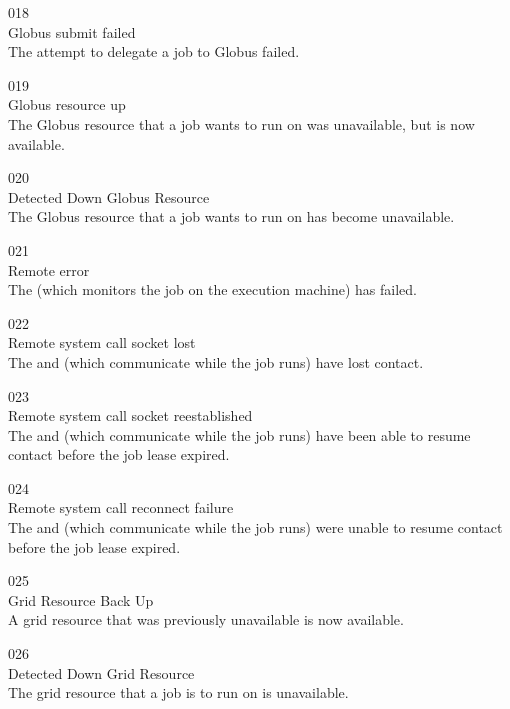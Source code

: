 \noindent{} 018 \\
 Globus submit failed \\
 The attempt to delegate a job to Globus
failed. 

\noindent{} 019 \\
 Globus resource up \\
 The Globus resource that a job wants to run
on was unavailable, but is now available.

\noindent{} 020 \\
 Detected Down Globus Resource \\
 The Globus resource that a job wants to run
on has become unavailable. 

\noindent{} 021 \\
 Remote error \\
 The  (which monitors the job
on the execution machine) has failed.

\noindent{} 022 \\
 Remote system call socket lost \\
 The  and 
(which communicate while the job runs) have lost contact.

\noindent{} 023 \\
 Remote system call socket reestablished \\
 The  and 
(which communicate while the job runs) have been able to resume
contact before the job lease expired.

\noindent{} 024 \\
 Remote system call reconnect failure \\
 The  and 
(which communicate while the job runs) were unable to resume
contact before the job lease expired.

\noindent{} 025 \\
 Grid Resource Back Up \\
 A grid resource that was previously
unavailable is now available.

\noindent{} 026 \\
 Detected Down Grid Resource \\
 The grid resource that a job is to
run on is unavailable.

